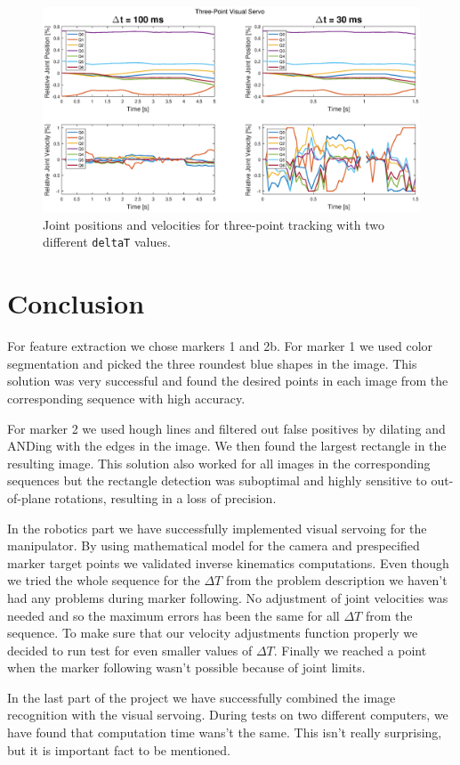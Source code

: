 \documentclass[]{scrartcl}
\begin{document}
\begin{figure}
	\centering
	\includegraphics[width=1\linewidth, trim = 75 0 75 0]{fig/threept.eps}
	\caption{Joint positions and velocities for three-point tracking with two different \texttt{deltaT} values.}
	\label{fig:threept}
\end{figure}
\clearpage
\section{Conclusion}
For feature extraction we chose markers 1 and 2b. For marker 1 we used color segmentation and picked the three roundest blue shapes in the image. This solution was very successful and found the desired points in each image from the corresponding sequence with high accuracy.\par
For marker 2 we used hough lines and filtered out false positives by dilating and ANDing with the edges in the image. We then found the largest rectangle in the resulting image. This solution also worked for all images in the corresponding sequences but the rectangle detection was suboptimal and highly sensitive to out-of-plane rotations, resulting in a loss of precision.\par
In the robotics part we have successfully implemented visual servoing for the manipulator. By using mathematical model for the camera and prespecified marker target points we validated inverse kinematics computations. Even though we tried the whole sequence for the $\Delta T$ from the problem description we haven't had any problems during marker following. No adjustment of joint velocities was needed and so the maximum errors has been the same for all $\Delta T$ from the sequence. To make sure that our velocity adjustments function properly we decided to run test for even smaller values of $\Delta T$. Finally we reached a point when the marker following wasn't possible because of joint limits.

In the last part of the project we have successfully combined the image recognition with the visual servoing. During tests on two different computers, we have found that computation time wans't the same. This isn't really surprising, but it is important fact to be mentioned.  
\end{document}

